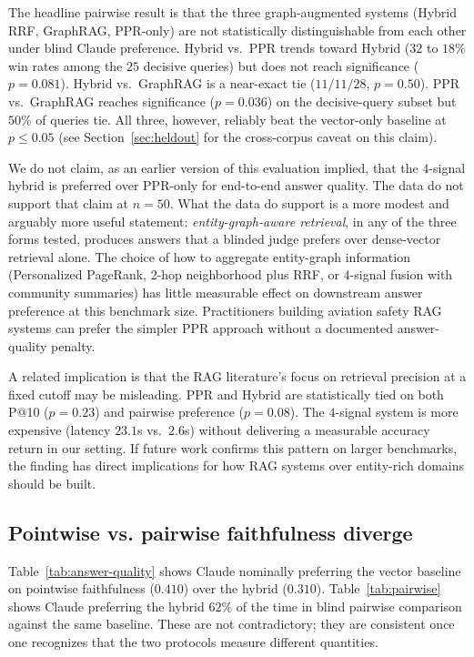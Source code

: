 \documentclass[10pt,a4paper]{article}
\begin{document}
The headline pairwise result is that the three graph-augmented
systems (Hybrid RRF, GraphRAG, PPR-only) are not statistically
distinguishable from each other under blind Claude preference. Hybrid
vs.\ PPR trends toward Hybrid ($32$ to $18\%$ win rates among the
$25$ decisive queries) but does not reach significance
($p = 0.081$). Hybrid vs.\ GraphRAG is a near-exact tie
($11 / 11 / 28$, $p = 0.50$). PPR vs.\ GraphRAG reaches significance
($p = 0.036$) on the decisive-query subset but $50\%$ of queries
tie. All three, however, reliably beat the vector-only baseline at
$p \le 0.05$ (see Section~\ref{sec:heldout} for the cross-corpus
caveat on this claim).

We do not claim, as an earlier version of this evaluation implied,
that the $4$-signal hybrid is preferred over PPR-only for end-to-end
answer quality. The data do not support that claim at
$n = 50$. What the data do support is a more modest and arguably
more useful statement: \emph{entity-graph-aware retrieval}, in any
of the three forms tested, produces answers that a blinded judge
prefers over dense-vector retrieval alone. The choice of how to
aggregate entity-graph information (Personalized PageRank, 2-hop
neighborhood plus RRF, or $4$-signal fusion with community
summaries) has little measurable effect on downstream answer
preference at this benchmark size. Practitioners building aviation
safety RAG systems can prefer the simpler PPR approach without a
documented answer-quality penalty.

A related implication is that the RAG literature's focus on
retrieval precision at a fixed cutoff may be misleading. PPR and
Hybrid are statistically tied on both P@10 ($p = 0.23$) and pairwise
preference ($p = 0.08$). The $4$-signal system is more expensive
(latency $23.1$s vs.\ $2.6$s) without delivering a measurable
accuracy return in our setting. If future work confirms this pattern
on larger benchmarks, the finding has direct implications for how
RAG systems over entity-rich domains should be built.

\subsection{Pointwise vs. pairwise faithfulness diverge}

Table~\ref{tab:answer-quality} shows Claude nominally preferring the
vector baseline on pointwise faithfulness ($0.410$) over the hybrid
($0.310$). Table~\ref{tab:pairwise} shows Claude preferring the
hybrid $62\%$ of the time in blind pairwise comparison against the
same baseline. These are not contradictory; they are consistent once
one recognizes that the two protocols measure different quantities.
\end{document}
